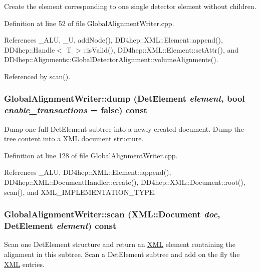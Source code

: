 Create the element corresponding to one single detector element without children. 

Definition at line 52 of file GlobalAlignmentWriter.cpp.

References \_\-ALU, \_\-U, addNode(), DD4hep::XML::Element::append(), DD4hep::Handle$<$ T $>$::isValid(), DD4hep::XML::Element::setAttr(), and DD4hep::Alignments::GlobalDetectorAlignment::volumeAlignments().

Referenced by scan().\hypertarget{class_d_d4hep_1_1_alignments_1_1_global_alignment_writer_a5e57677f6c3ff8a881a1eb52bf296958}{
\subsubsection[{dump}]{ GlobalAlignmentWriter::dump ({\bf DetElement} {\em element}, \/  bool {\em enable\_\-transactions} = {\ttfamily false}) const}}
\label{class_d_d4hep_1_1_alignments_1_1_global_alignment_writer_a5e57677f6c3ff8a881a1eb52bf296958}


Dump one full DetElement subtree into a newly created document. Dump the tree content into a \hyperlink{namespace_d_d4hep_1_1_x_m_l}{XML} document structure. 

Definition at line 128 of file GlobalAlignmentWriter.cpp.

References \_\-ALU, DD4hep::XML::Element::append(), DD4hep::XML::DocumentHandler::create(), DD4hep::XML::Document::root(), scan(), and XML\_\-IMPLEMENTATION\_\-TYPE.\hypertarget{class_d_d4hep_1_1_alignments_1_1_global_alignment_writer_a1cd63b0381fcc67b4550630f61529ceb}{
\subsubsection[{scan}]{ GlobalAlignmentWriter::scan ({\bf XML::Document} {\em doc}, \/  {\bf DetElement} {\em element}) const}}
\label{class_d_d4hep_1_1_alignments_1_1_global_alignment_writer_a1cd63b0381fcc67b4550630f61529ceb}


Scan one DetElement structure and return an \hyperlink{namespace_d_d4hep_1_1_x_m_l}{XML} element containing the alignment in this subtree. Scan a DetElement subtree and add on the fly the \hyperlink{namespace_d_d4hep_1_1_x_m_l}{XML} entries. 

